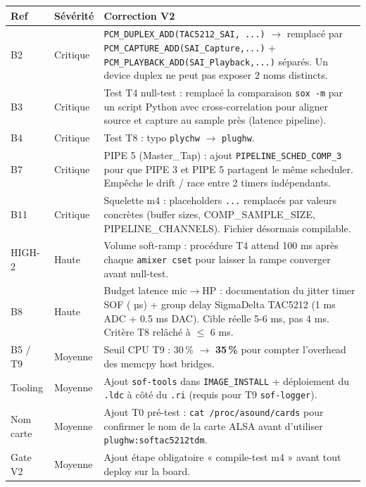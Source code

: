 \documentclass[11pt,a4paper]{article}
\begin{document}
\begin{center}
\begin{tabularx}{\textwidth}{llX}
\toprule
\textbf{Ref} & \textbf{Sévérité} & \textbf{Correction V2} \\
\midrule
B2 & Critique & \texttt{PCM\_DUPLEX\_ADD(TAC5212\_SAI, ...)} $\rightarrow$ remplacé par \texttt{PCM\_CAPTURE\_ADD(SAI\_Capture,...)} + \texttt{PCM\_PLAYBACK\_ADD(SAI\_Playback,...)} séparés. Un device duplex ne peut pas exposer 2 noms distincts. \\
B3 & Critique & Test T4 null-test : remplacé la comparaison \texttt{sox -m} par un script Python avec cross-correlation pour aligner source et capture au sample près (latence pipeline). \\
B4 & Critique & Test T8 : typo \texttt{plychw} $\rightarrow$ \texttt{plughw}. \\
B7 & Critique & PIPE 5 (Master\_Tap) : ajout \texttt{PIPELINE\_SCHED\_COMP\_3} pour que PIPE 3 et PIPE 5 partagent le même scheduler. Empêche le drift / race entre 2 timers indépendants. \\
B11 & Critique & Squelette m4 : placeholders \texttt{...} remplacés par valeurs concrètes (buffer sizes, COMP\_SAMPLE\_SIZE, PIPELINE\_CHANNELS). Fichier désormais compilable. \\
HIGH-2 & Haute & Volume soft-ramp : procédure T4 attend 100 ms après chaque \texttt{amixer cset} pour laisser la rampe converger avant null-test. \\
B8 & Haute & Budget latence mic$\rightarrow$HP : documentation du jitter timer SOF (\textpm 500 µs) + group delay SigmaDelta TAC5212 (1 ms ADC + 0.5 ms DAC). Cible réelle 5-6 ms, pas 4 ms. Critère T8 relâché à $\leq$ 6 ms. \\
B5 / T9 & Moyenne & Seuil CPU T9 : 30\,\% $\rightarrow$ \textbf{35\,\%} pour compter l'overhead des memcpy host bridges. \\
Tooling & Moyenne & Ajout \texttt{sof-tools} dans \texttt{IMAGE\_INSTALL} + déploiement du \texttt{.ldc} à côté du \texttt{.ri} (requis pour T9 \texttt{sof-logger}). \\
Nom carte & Moyenne & Ajout T0 pré-test : \texttt{cat /proc/asound/cards} pour confirmer le nom de la carte ALSA avant d'utiliser \texttt{plughw:softac5212tdm}. \\
Gate V2 & Moyenne & Ajout étape obligatoire « compile-test m4 » avant tout deploy sur la board. \\
\bottomrule
\end{tabularx}
\end{center}
\end{document}
